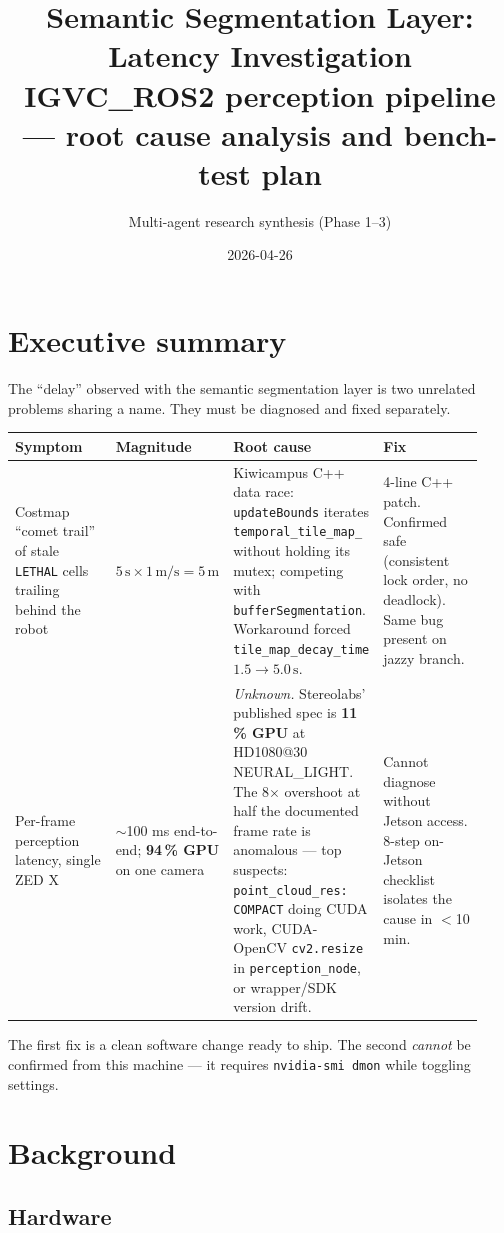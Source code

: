 \documentclass[11pt]{article}
\title{Semantic Segmentation Layer: Latency Investigation\\[4pt]
\large IGVC\_ROS2 perception pipeline --- root cause analysis and bench-test plan}
\author{Multi-agent research synthesis (Phase 1--3)}
\date{2026-04-26}
\begin{document}
\maketitle

\section{Executive summary}

The ``delay'' observed with the semantic segmentation layer is two unrelated
problems sharing a name. They must be diagnosed and fixed separately.

\begin{longtable}{p{0.22\linewidth} p{0.22\linewidth} p{0.27\linewidth} p{0.22\linewidth}}
\toprule
\textbf{Symptom} & \textbf{Magnitude} & \textbf{Root cause} & \textbf{Fix} \\
\midrule
Costmap ``comet trail'' of stale \texttt{LETHAL} cells trailing behind the
robot &
$5\,\mathrm{s} \times 1\,\mathrm{m/s} = 5\,\mathrm{m}$ &
Kiwicampus C++ data race: \texttt{updateBounds} iterates
\texttt{temporal\_tile\_map\_} without holding its mutex; competing with
\texttt{bufferSegmentation}. Workaround forced \texttt{tile\_map\_decay\_time}
$1.5 \to 5.0\,\mathrm{s}$. &
4-line C++ patch. Confirmed safe (consistent lock order, no deadlock). Same
bug present on jazzy branch. \\
\midrule
Per-frame perception latency, single ZED X &
$\sim$100 ms end-to-end; \textbf{94\,\% GPU} on one camera &
\emph{Unknown.} Stereolabs' published spec is \textbf{11\,\% GPU} at
HD1080@30 NEURAL\_LIGHT. The 8$\times$ overshoot at half the documented
frame rate is anomalous --- top suspects: \texttt{point\_cloud\_res:
COMPACT} doing CUDA work, CUDA-OpenCV \texttt{cv2.resize} in
\texttt{perception\_node}, or wrapper/SDK version drift. &
Cannot diagnose without Jetson access. 8-step on-Jetson checklist
isolates the cause in $<$10 min. \\
\bottomrule
\end{longtable}

The first fix is a clean software change ready to ship. The second
\emph{cannot} be confirmed from this machine --- it requires
\texttt{nvidia-smi dmon} while toggling settings.

\section{Background}

\subsection{Hardware}
\end{document}
